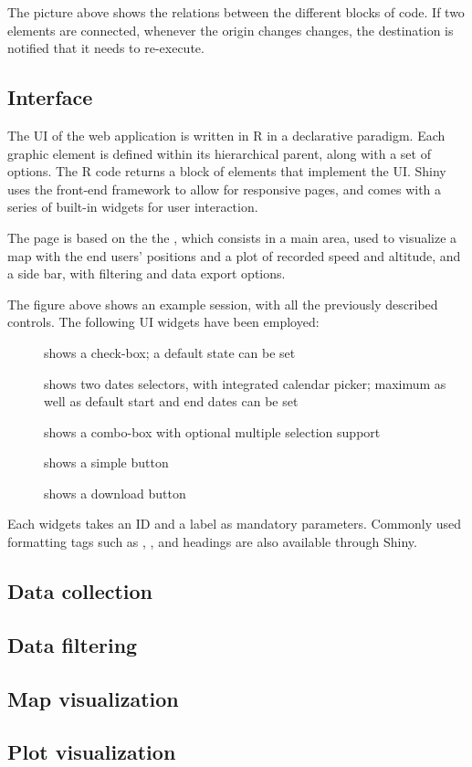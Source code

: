 

The picture above shows the relations between the different blocks of code.
If two elements are connected, whenever the origin changes changes, the destination is notified that it needs to re-execute.



\subsection{Interface}
The UI of the web application is written in R in a declarative paradigm.
Each graphic element is defined within its hierarchical parent, along with a set of options.
The R code returns a block of  elements that implement the UI.
Shiny uses the  front-end framework to allow for responsive pages, and comes with a series of built-in widgets for user interaction.

The page is based on the the , which consists in a main area, used to visualize a map with the end users' positions and a plot of recorded speed and altitude, and a side bar, with filtering and data export options.


The figure above shows an example session, with all the previously described controls.
The following UI widgets have been employed:

\begin{description}
	\item[] shows a check-box; a default state can be set
	\item[] shows two dates selectors, with integrated calendar picker; maximum as well as default start and end dates can be set
	\item[] shows a combo-box with optional multiple selection support
	\item[] shows a simple button
	\item[] shows a download button
\end{description}

Each widgets takes an ID and a label as mandatory parameters.
Commonly used formatting tags such as , , and  headings are also available through Shiny.


\subsection{Data collection}


\subsection{Data filtering}


\subsection{Map visualization}


\subsection{Plot visualization}
